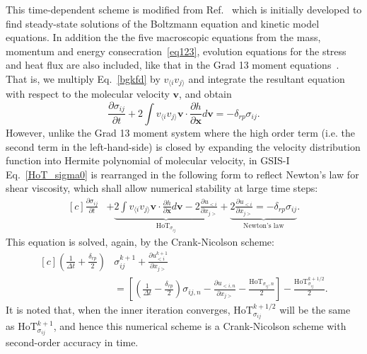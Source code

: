 \documentclass[onefignum,onetabnum]{siamart171218}
\begin{document}
This time-dependent scheme is modified from  Ref.~\cite{SuArXiv2019} which is initially developed to find steady-state solutions of the Boltzmann equation and kinetic model equations. In addition the the five macroscopic equations from the mass, momentum and energy consecration~\eqref{eq123}, evolution equations for the stress and heat flux are also included, like that in the Grad 13 moment equations~\cite{Grad1949}. That is,  we multiply Eq.~\eqref{bgkfd} by $v_{\langle{i}}v_{j\rangle}$ and integrate the resultant equation with respect to the molecular velocity $\bm{v}$, and obtain 
\begin{equation}\label{HoT_sigma0}
\frac{\partial \sigma_{ij}}{\partial {t}}
+2\int{v_{\langle{i}}v_{j\rangle}} \bm{v}\cdot\frac{\partial h}{\partial \bm{x}}d\bm{v}=-\delta_{rp}\sigma_{ij}.
\end{equation}
However, unlike the Grad 13 moment system where the high order term (i.e. the second term in the left-hand-side) is closed by expanding the velocity distribution function into Hermite polynomial of molecular velocity, in GSIS-I Eq.~\eqref{HoT_sigma0} is rearranged in the following form to reflect Newton's law for shear viscosity, which shall allow numerical stability at large time steps:
\begin{equation}\label{HoT_sigma}
\begin{aligned}[c]
\frac{\partial \sigma_{ij}}{\partial {t}}
&+\underbrace{2\int{v_{\langle{i}}v_{j\rangle}} \bm{v}\cdot\frac{\partial h}{\partial \bm{x}}d\bm{v}-2\frac{\partial{u_{<i}}}{\partial {x_{j>}}}}_{\text{HoT}_{\sigma_{ij}}}
+\underbrace{2\frac{\partial{u_{<i}}}{\partial {x_{j>}}}=-\delta_{rp}\sigma_{ij}}_{\text{Newton's law}}.
\end{aligned}
\end{equation}
This equation is solved, again, by the Crank-Nicolson scheme:
\begin{equation}\label{HoT_sigma2}
\begin{aligned}[c]
\left(\frac{1}{\Delta{t}}
+\frac{\delta_{rp}}{2}\right)
&\sigma^{k+1}_{ij}
+\frac{\partial{u^{k+1}_{<i}}}{\partial {x_{j>}}}
\\
&=\left[\left(\frac{1}{\Delta{t}}-\frac{\delta_{rp}}{2}\right)\sigma_{ij,n}
-\frac{\partial{u_{<i,n}}}{\partial {x_{j>}}}-\frac{\text{HoT}_{\sigma_{ij},n}}{2}
\right]
-\frac{\text{HoT}^{k+1/2}_{\sigma_{ij}}}{2}.
\end{aligned}
\end{equation}
It is noted that, when the inner iteration converges,  $\text{HoT}^{k+1/2}_{\sigma_{ij}}$ will be the same as $\text{HoT}^{k+1}_{\sigma_{ij}}$, and hence this numerical scheme is a Crank-Nicolson scheme with second-order accuracy in time.
\end{document}
